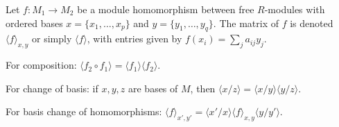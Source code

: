 Let $f: M_1 \to M_2$ be a module homomorphism between free $R$-modules with ordered bases $x = \{x_1, \dots, x_p\}$ and $y = \{y_1, \dots, y_q\}$. The matrix of $f$ is denoted $\langle f \rangle_{x,y}$ or simply $\langle f \rangle$, with entries given by $f(x_i) = \sum_j a_{ij} y_j$.

For composition: $\langle f_2 \circ f_1 \rangle = \langle f_1 \rangle \langle f_2 \rangle$.

For change of basis: if $x, y, z$ are bases of $M$, then $\langle x/z \rangle = \langle x/y \rangle \langle y/z \rangle$.

For basis change of homomorphisms: $\langle f \rangle_{x',y'} = \langle x'/x \rangle \langle f \rangle_{x,y} \langle y/y' \rangle$.
